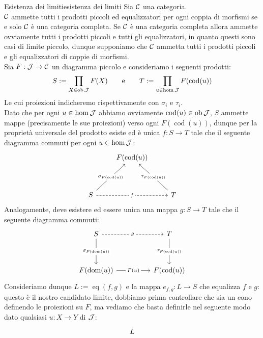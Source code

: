 \documentclass[openany]{book}
\renewcommand\C{\mc{C}}
\newcommand\J{\mc{J}}
\newcommand\eq{\operatorname{eq}}
\newcommand\cod{\operatorname{cod}}
\begin{document}
\begin{theorem}{Esistenza dei limiti}{esistenza dei limiti}
    Sia $\C$ una categoria.\\
    $\C$ ammette tutti i prodotti piccoli ed equalizzatori per ogni coppia di morfismi se e solo $\C$ è una categoria completa.
    \proof 
    Se $\C$ è una categoria completa allora ammette ovviamente tutti i prodotti piccoli e tutti gli equalizzatori, in quanto questi sono casi di limite piccolo, dunque supponiamo che $\C$ ammetta tutti i prodotti piccoli e gli equalizzatori di coppie di morfismi.\\
    Sia $F:\J\to\C$ un diagramma piccolo e consideriamo i seguenti prodotti: 
    \[ S := \prod_{X \in\ob\J}F(X) \qquad\text{e}\qquad T:= \prod_{u \in \hom\J} F(\cod(u)) \]
    Le cui proiezioni indicheremo rispettivamente con $\sigma_i$ e $\tau_i$.\\
    Dato che per ogni $u \in \hom\J$ abbiamo ovviamente $\cod(u) \in \ob\J$, $S$ ammette mappe (precisamente le sue proiezioni) verso ogni $F(\cod(u))$, dunque per la proprietà universale del prodotto esiste ed è unica $f:S\to T$ tale che il seguente diagramma commuti per ogni $u \in \hom\J$:
    \[\begin{tikzcd}
    	& {F(\cod(u))} \\
	    \\
    	S && T
    	\arrow["{\sigma_{F(\cod(u))}}"{description}, from=3-1, to=1-2]
    	\arrow["f"{description}, dashed, from=3-1, to=3-3]
    	\arrow["{\tau_{F(\cod(u))}}"{description}, from=3-3, to=1-2]
    \end{tikzcd}\]
    Analogamente, deve esistere ed essere unica una mappa $g: S\to T$ tale che il seguente diagramma commuti:
        \[\begin{tikzcd}
    	S && T \\
    	\\
    	{F(\dom(u))} && {F(\cod(u))}
    	\arrow["g"{description}, dashed, from=1-1, to=1-3]
    	\arrow["{\sigma_{F(\dom(u))}}"{description}, from=1-1, to=3-1]
    	\arrow["{\tau_{F(\cod(u))}}"{description}, from=1-3, to=3-3]
    	\arrow["{F(u)}"{description}, from=3-1, to=3-3]
    \end{tikzcd}\]
    Consideriamo dunque $L:=\eq(f,g)$ e la mappa $e_{f,g}: L \to S$ che equalizza $f$ e $g$: questo è il nostro candidato limite, dobbiamo prima controllare che sia un cono definendo le proiezioni su $F$, ma vediamo che basta definirle nel seguente modo dato qualsiasi $u:X\to Y$ di $\J$:
    \[\begin{tikzcd}
    	{L} \\

\end{tikzcd}\]
\end{theorem}
\end{document}
